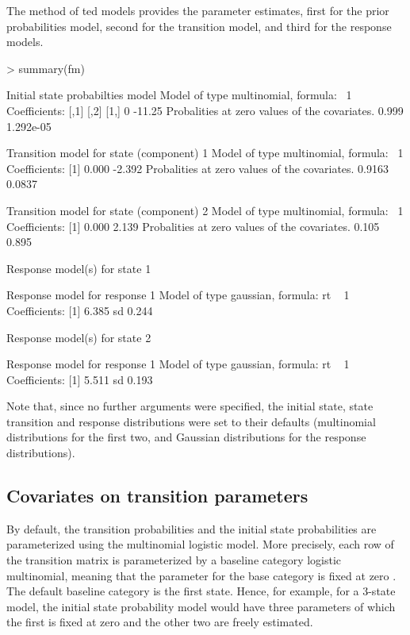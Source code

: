 \documentclass[article]{jss}
\begin{document}
The  method of ted models provides the
parameter estimates, first for the prior probabilities model, second
for the transition model, and third for the response models.

\begin{CodeChunk}
\begin{CodeInput}
> summary(fm)
\end{CodeInput}
\begin{CodeOutput}
Initial state probabilties model 
Model of type multinomial, formula: ~1
Coefficients: 
     [,1]      [,2]
[1,]    0 -11.25
Probalities at zero values of the covariates.
0.999 1.292e-05 

Transition model for state (component) 1 
Model of type multinomial, formula: ~1
Coefficients: 
[1]  0.000 -2.392
Probalities at zero values of the covariates.
0.9163 0.0837 

Transition model for state (component) 2 
Model of type multinomial, formula: ~1
Coefficients: 
[1] 0.000 2.139
Probalities at zero values of the covariates.
0.105 0.895 

Response model(s) for state 1 

Response model for response 1 
Model of type gaussian, formula: rt ~ 1
Coefficients: 
[1] 6.385
sd  0.244

Response model(s) for state 2 

Response model for response 1 
Model of type gaussian, formula: rt ~ 1
Coefficients: 
[1] 5.511
sd  0.193 
\end{CodeOutput}
\end{CodeChunk}

Note that, since no further arguments were specified, the initial
state, state transition and response distributions were set to their
defaults (multinomial distributions for the first two, and Gaussian
distributions for the response distributions).

\subsection{Covariates on transition parameters}

By default, the transition probabilities and the initial state
probabilities are parameterized using the multinomial logistic model.
More precisely, each row of the transition matrix is parameterized by
a baseline category logistic multinomial, meaning that the parameter
for the base category is fixed at zero \citep[see][p.\ 267 ff., for
multinomial logistic models and various
parameterizations]{Agresti2002}.  The default baseline category is the
first state.  Hence, for example, for a 3-state model, the initial
state probability model would have three parameters of which the first
is fixed at zero and the other two are freely estimated.
\end{document}
